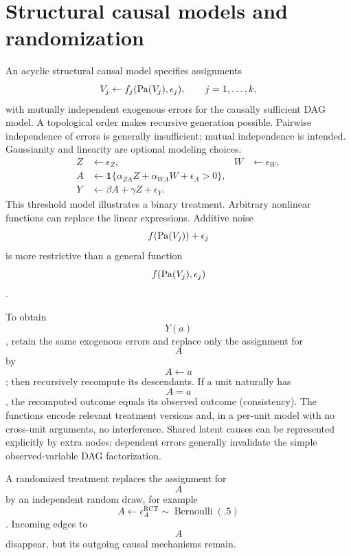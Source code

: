 \section{Structural causal models and randomization}
An acyclic structural causal model specifies assignments
\begin{equation}
V_j\leftarrow f_j(\operatorname{Pa}(V_j),\epsilon_j),\qquad j=1,\ldots,k,
\end{equation}
with mutually independent exogenous errors for the causally sufficient DAG model. A topological order makes recursive generation possible. Pairwise independence of errors is generally insufficient; mutual independence is intended. Gaussianity and linearity are optional modeling choices.
\begin{align}
Z&\leftarrow\epsilon_Z, & W&\leftarrow\epsilon_W,\\
A&\leftarrow\mathbf1\{\alpha_{ZA}Z+\alpha_{WA}W+\epsilon_A>0\},\\
Y&\leftarrow\beta A+\gamma Z+\epsilon_Y.
\end{align}
This threshold model illustrates a binary treatment. Arbitrary nonlinear functions can replace the linear expressions. Additive noise $$f(\operatorname{Pa}(V_j))+\epsilon_j$$ is more restrictive than a general function $$f(\operatorname{Pa}(V_j),\epsilon_j)$$.
\begin{todo}
To obtain $$Y(a)$$, retain the same exogenous errors and replace only the assignment for $$A$$ by $$A\leftarrow a$$; then recursively recompute its descendants. If a unit naturally has $$A=a$$, the recomputed outcome equals its observed outcome (consistency). The functions encode relevant treatment versions and, in a per-unit model with no cross-unit arguments, no interference. Shared latent causes can be represented explicitly by extra nodes; dependent errors generally invalidate the simple observed-variable DAG factorization.
\end{todo}
A randomized treatment replaces the assignment for $$A$$ by an independent random draw, for example $$A\leftarrow\epsilon_A^{\mathrm{RCT}}\sim\operatorname{Bernoulli}(.5)$$. Incoming edges to $$A$$ disappear, but its outgoing causal mechanisms remain.

